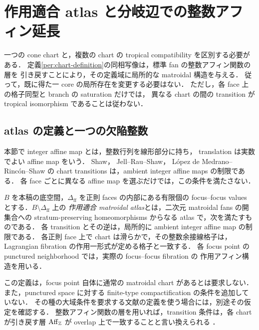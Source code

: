 
\section{作用適合 atlas と分岐辺での整数アフィン延長}
\label{atl:section}

一つの cone chart と，複数の chart の tropical compatibility を区別する必要がある．
定義\ref{per:chart-definition}の同相写像は，標準 fan の整数アフィン関数の層を
引き戻すことにより，その定義域に局所的な matroidal 構造を与える．
従って，既に得た一 core の局所存在を変更する必要はない．
ただし，各 face 上の格子同型と branch の saturation だけでは，
異なる chart の間の transition が tropical isomorphism であることは従わない．

\subsection{atlas の定義と一つの欠陥整数}

本節で integer affine map とは，整数行列を線形部分に持ち，
translation は実数でよい affine map をいう．
Shaw\cite[Definition~3.1]{ShawSurfaces}，
Jell--Rau--Shaw\cite[Definitions~2.1, 5.1]{JellRauShaw}，
L\'opez de Medrano--Rinc\'on--Shaw\cite[Definitions~2.2--2.3]{LRSChern}
の chart transitions は，ambient integer affine maps の制限である．
各 face ごとに異なる affine map を選ぶだけでは，この条件を満たさない．

\begin{definition}
\label{atl:definition}
$B$ を本稿の底空間，$\Delta_{\mathrm{ff}}$ を正則 faces の内部にある有限個の
focus--focus values とする．$B\setminus\Delta_{\mathrm{ff}}$ 上の
\emph{作用適合 matroidal atlas}とは，二次元 matroidal fans の開集合への
stratum-preserving homeomorphisms からなる atlas で，次を満たすものである．
各 transition とその逆は，局所的に ambient integer affine map の制限である．
各正則 face 上で chart は滑らかで，その整数余接線格子は，
Lagrangian fibration の作用一形式が定める格子と一致する．
各 focus point の punctured neighborhood では，実際の focus--focus fibration の
作用アフィン構造を用いる．
\end{definition}

この定義は，focus point 自体に通常の matroidal chart があるとは要求しない．
また，punctured space に対する finite-type compactification の条件を追加していない．
その種の大域条件を要求する文献の定義を使う場合には，別途その仮定を確認する．
整数アフィン関数の層を用いれば，transition 条件は，各 chart が引き戻す層
$\operatorname{Aff}_{\mathbb Z}$ が overlap 上で一致することと言い換えられる
\cite[Definition~3.1]{JellRauShaw}．

